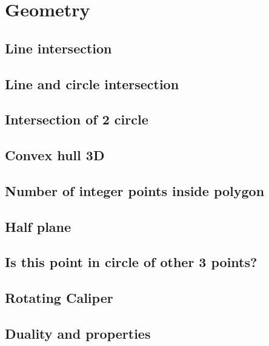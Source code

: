 \section{Geometry}
\subsection{Line intersection}
\raggedbottom
\hrulefill
\subsection{Line and circle intersection}
\raggedbottom
\hrulefill
\subsection{Intersection of 2 circle}
\raggedbottom
\hrulefill
\subsection{Convex hull 3D}
\raggedbottom
\hrulefill
\subsection{Number of integer points inside polygon}
\raggedbottom
\hrulefill
\subsection{Half plane}
\raggedbottom
\hrulefill
\subsection{Is this point in circle of other 3 points?}
\raggedbottom
\hrulefill
\subsection{Rotating Caliper}
\raggedbottom
\hrulefill
\subsection{Duality and properties}

\hrulefill
